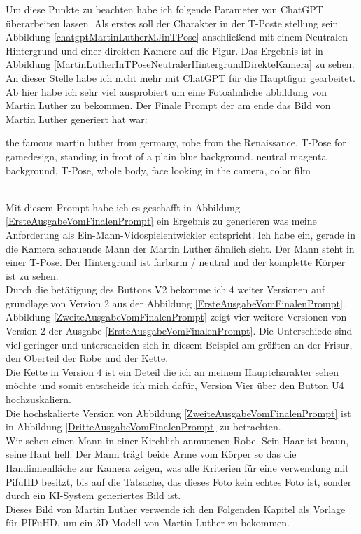Um diese Punkte zu beachten habe ich folgende Parameter von ChatGPT überarbeiten lassen. Als erstes soll der Charakter in der T-Poste stellung sein Abbildung \ref{chatgptMartinLutherMJinTPose} anschließend mit einem Neutralen Hintergrund und einer direkten Kamere auf die Figur. Das Ergebnis ist in Abbildung \ref{MartinLutherInTPoseNeutralerHintergrundDirekteKamera} zu sehen.
\\
An dieser Stelle habe ich nicht mehr mit ChatGPT für die Hauptfigur gearbeitet. Ab hier habe ich sehr viel ausprobiert um eine Fotoähnliche abbildung von Martin Luther zu bekommen. Der Finale Prompt der am ende das Bild von Martin Luther generiert hat war:
\\
\rmfamily
\begin{large}
	the famous martin luther from germany, robe from the Renaissance, T-Pose for gamedesign, standing in front of a plain blue background. neutral magenta background, T-Pose, whole body, face looking in the camera, color film
\end{large}
\sffamily
\\
Mit diesem Prompt habe ich es geschafft in Abbildung \ref{ErsteAusgabeVomFinalenPrompt} ein Ergebnis zu generieren was meine Anforderung als Ein-Mann-Vidospielentwickler entspricht. Ich habe ein, gerade in die Kamera schauende Mann der Martin Luther ähnlich sieht. Der Mann steht in einer T-Pose. Der Hintergrund ist farbarm / neutral und der komplette Körper ist zu sehen. 
\\
Durch die betätigung des Buttons V2 bekomme ich 4 weiter Versionen auf grundlage von Version 2 aus der Abbildung \ref{ErsteAusgabeVomFinalenPrompt}.
\\
Abbildung \ref{ZweiteAusgabeVomFinalenPrompt} zeigt vier weitere Versionen von Version 2 der Ausgabe \ref{ErsteAusgabeVomFinalenPrompt}. Die Unterschiede sind viel geringer und unterscheiden sich in diesem Beispiel am größten an der Frisur, den Oberteil der Robe und der Kette.
\\
Die Kette in Version 4 ist ein Deteil die ich an meinem Hauptcharakter sehen möchte und somit entscheide ich mich dafür, Version Vier über den Button U4 hochzuskaliern.
\\
Die hochskalierte Version von Abbildung \ref{ZweiteAusgabeVomFinalenPrompt} ist in Abbildung \ref{DritteAusgabeVomFinalenPrompt} zu betrachten.
\\
Wir sehen einen Mann in einer Kirchlich anmutenen Robe. Sein Haar ist braun, seine Haut hell. Der Mann trägt beide Arme vom Körper so das die Handinnenfläche zur Kamera zeigen, was alle Kriterien für eine verwendung mit PifuHD besitzt, bis auf die Tatsache, das dieses Foto kein echtes Foto ist, sonder durch ein KI-System generiertes Bild ist.
\\
Dieses Bild von Martin Luther verwende ich den Folgenden Kapitel als Vorlage für PIFuHD, um ein 3D-Modell von Martin Luther zu bekommen.
